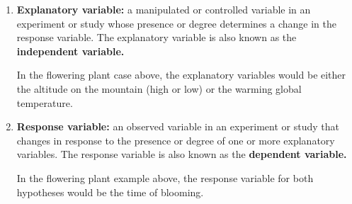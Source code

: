 \documentclass[12pt]{exam}
\newcommand*\AnswerBox[2]{%
    \parbox[t][#1]{0.92\textwidth}{%
    \begin{solution}#2\end{solution}}
}
\begin{document}
\begin{enumerate}
\item \label{response_variable}
  \textbf{Explanatory variable:} a manipulated or controlled variable in an experiment
  or study whose presence or degree determines a change in the response
  variable. The explanatory variable is also known as the \textbf{independent
  variable.}
  
  In the flowering plant case above, the explanatory variables would be
  either the altitude on the mountain (high or low) or the warming global 
  temperature.
   
\item
  \textbf{Response variable:} an observed variable in an experiment or
  study that changes in response to the presence or degree of one
  or more explanatory variables. The response variable is also known as the
  \textbf{dependent variable.} 
  
  In the flowering plant example above, the response variable for both
  hypotheses would be the time of blooming.
  
\end{enumerate}
%
%
%
%
%
%
%
%
%
%
%
%
%
%
%
%
\end{document}
